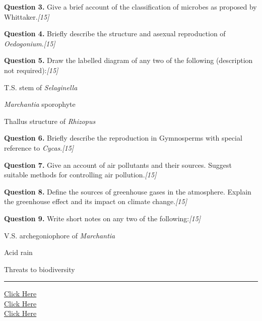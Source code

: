 \documentclass[11pt,a4paper]{article}
\newcommand{\pts}[1]{\hfill   \textit{[#1]}}
\begin{document}
\medskip


\noindent   \textbf{Question 3.} Give a brief account of the classification of microbes as proposed by Whittaker.\pts{15}

\medskip


\noindent   \textbf{Question 4.} Briefly describe the structure and asexual reproduction of   \textit{Oedogonium}.\pts{15}

\medskip


\noindent   \textbf{Question 5.} Draw the labelled diagram of any two of the following (description not required):\pts{15}

\begin{parts}
  \item T.S. stem of   \textit{Selaginella}
  \item   \textit{Marchantia} sporophyte
  \item Thallus structure of   \textit{Rhizopus}
\end{parts}

\medskip


\noindent   \textbf{Question 6.} Briefly describe the reproduction in Gymnosperms with special reference to   \textit{Cycas}.\pts{15}

\medskip


\noindent   \textbf{Question 7.} Give an account of air pollutants and their sources. Suggest suitable methods for controlling air pollution.\pts{15}

\medskip


\noindent   \textbf{Question 8.} Define the sources of greenhouse gases in the atmosphere. Explain the greenhouse effect and its impact on climate change.\pts{15}

\medskip


\noindent   \textbf{Question 9.} Write short notes on any two of the following:\pts{15}

\begin{parts}
  \item V.S. archegoniophore of   \textit{Marchantia}
  \item Acid rain
  \item Threats to biodiversity
\end{parts}

\vfill
\rule{\linewidth}{0.4pt}

\begin{center}\small
\href{https://bhu-exam.vercel.app/}{Click Here}\\[4pt]\href{https://me-aryan.vercel.app/}{Click Here}\\[4pt]\href{https://quashan-me.vercel.app/}{Click Here}
\end{center}
\end{document}
